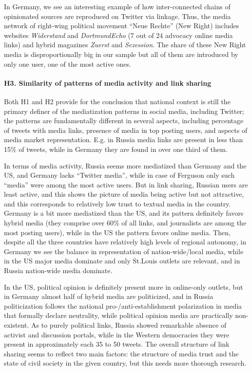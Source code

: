 In Germany, we see an interesting example of how inter-connected chains of opinionated sources are reproduced on Twitter via linkage. Thus, the media network of right-wing political movement “Neue Rechte” (New Right) includes websites \textit{Widerstand} and \textit{DortmundEcho} (7 out of 24 advocacy online media links) and hybrid magazines \textit{Zuerst} and \textit{Sezession}. The share of these New Right media is disproportionally big in our sample but all of them are introduced by only one user, one of the most active ones.

\paragraph{H3. Similarity of patterns of media activity and link sharing}
Both H1 and H2 provide for the conclusion that national context is still the primary definer of the mediatization patterns in social media, including Twitter; the patterns are fundamentally different in several aspects, including percentage of tweets with media links, presence of media in top posting users, and aspects of media market representation. E.g. in Russia media links are present in less than 15\% of tweets, while in Germany they are found in over one third of them.

In terms of media activity, Russia seems more mediatized than Germany and the US, and Germany lacks “Twitter media”, while in case of Ferguson only such “media” were among the most active users. But in link sharing, Russian users are least active, and this shows the picture of media being active but not attractive, and this corresponds to relatively low trust to textual media in the country. Germany is a bit more mediatized than the US, and its pattern definitely favors hybrid media (they comprise over 60\% of all links, and journalists are among the most posting users), while in the US the pattern favors online media. Then, despite all the three countries have relatively high levels of regional autonomy, in Germany we see the balance in representation of nation-wide/local media, while in the US major media dominate and only St.Louis outlets are relevant, and in Russia nation-wide media dominate.

In the US, political opinion is definitely present more in online-only outlets, but in Germany almost half of hybrid media are politicized, and in Russia politicization follows the national pro-/anti-establishment polarization in media that formally declare neutrality, while political opinion media are practically non-existent. As to purely political links, Russia showed remarkable absence of activist and discussion portals, while in the Western democracies they were present in approximately each 35 to 50 tweets. The overall structure of link sharing seems to reflect two main factors: the structure of media trust and the state of civil society in the given country, but this needs more thorough research.

